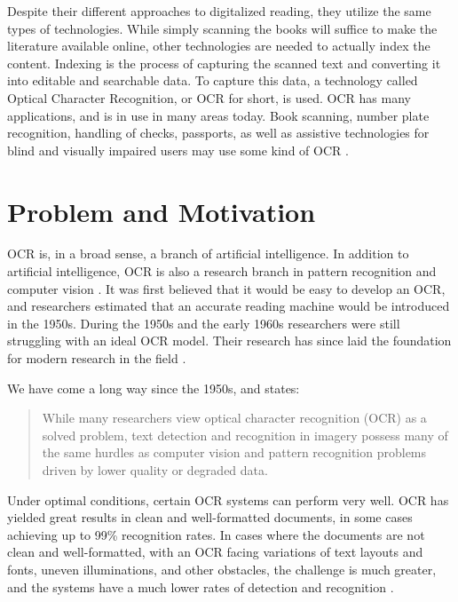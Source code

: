 Despite their different approaches to digitalized reading, they utilize the same types of technologies. While simply scanning the books will suffice to make the literature available online, other technologies are needed to actually index the content. Indexing is the process of capturing the scanned text and converting it into editable and searchable data. To capture this data, a technology called Optical Character Recognition, or OCR for short, is used. OCR has many applications, and is in use in many areas today. Book scanning, number plate recognition, handling of checks, passports, as well as assistive technologies for blind and visually impaired users may use some kind of OCR \citep{mori1999optical, kurzweil2000reading}.


\section{Problem and Motivation}
\label{sec:problem_motivation}
OCR is, in a broad sense, a branch of artificial intelligence. In addition to artificial intelligence, OCR is also a research branch in pattern recognition and computer vision \citep{mori1999optical}. It was first believed that it would be easy to develop an OCR, and researchers estimated that an accurate reading machine would be introduced in the 1950s. During the 1950s and the early 1960s researchers were still struggling with an ideal OCR model. Their research has since laid the foundation for modern research in the field \citep{mori1992historical}.

We have come a long way since the 1950s, and \citep{ye2015text} states:

\begin{quote}
    While many researchers view optical character recognition (OCR) as a solved problem, text detection and recognition in imagery possess many of the same hurdles as computer vision and pattern recognition problems driven by lower quality or degraded data.
\end{quote}

Under optimal conditions, certain OCR systems can perform very well. OCR has yielded great results in clean and well-formatted documents, in some cases achieving up to 99\% recognition rates. In cases where the documents are not clean and well-formatted, with an OCR facing variations of text layouts and fonts, uneven illuminations, and other obstacles, the challenge is much greater, and the systems have a much lower rates of detection and recognition \citep{ye2015text}.

